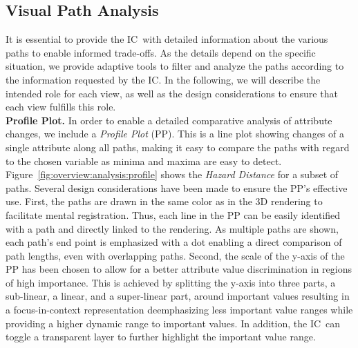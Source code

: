 \documentclass[conference,10pt,letter]{IEEEtran}
\def\IC{IC}
\begin{document}
\subsection{Visual Path Analysis} \label{sec:overview:pathanalysis}
It is essential to provide the \IC\ with detailed information about the various paths to enable informed trade-offs. As the details depend on the specific situation, we provide adaptive tools to filter and analyze the paths according to the information requested by the \IC . In the following, we will describe the intended role for each view, as well as the design considerations to ensure that each view fulfills this role.\\
%
\noindent \textbf{Profile Plot.} In order to enable a detailed comparative analysis of attribute changes, we include a \emph{Profile Plot} (PP). This is a line plot showing changes of a single attribute along all paths, making it easy to compare the paths with regard to the chosen variable as minima and maxima are easy to detect. Figure~\ref{fig:overview:analysis:profile} shows the \emph{Hazard Distance} for a subset of paths. Several design considerations have been made to ensure the PP's effective use. First, the paths are drawn in the same color as in the 3D rendering to facilitate mental registration. Thus, each line in the PP can be easily identified with a path and directly linked to the rendering. As multiple paths are shown, each path's end point is emphasized with a dot enabling a direct comparison of path lengths, even with overlapping paths. Second, the scale of the y-axis of the PP has been chosen to allow for a better attribute value discrimination in regions of high importance. This is achieved by splitting the y-axis into three parts, a sub-linear, a linear, and a super-linear part, around important values resulting in a focus-in-context representation deemphasizing less important value ranges while providing a higher dynamic range to important values. In addition, the \IC\ can toggle a transparent layer to further highlight the important value range. \\
%
\end{document}
